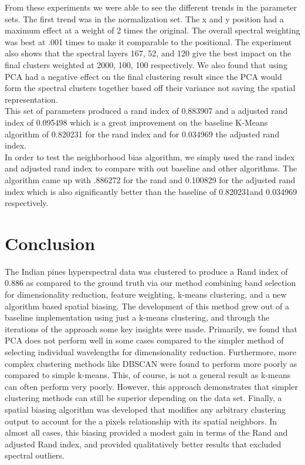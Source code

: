 \documentclass[journal]{IEEEtran}
\begin{document}
  From these experiments we were able to see the different trends in the parameter sets. The first trend was in the normalization set. The x and y position had a maximum effect at a weight of 2 times the original. The overall spectral weighting was best at .001 times to make it comparable to the positional. The experiment also shows that the spectral layers 167, 52, and 120 give the best impact on the final clusters weighted at 2000, 100, 100 respectively. We also found that using PCA had a negative effect on the final clustering result since the PCA would form the spectral clusters together based off their variance not saving the spatial representation.\\

  This set of parameters produced a rand index of 0.883907 and a adjusted rand index of 0.095498 which is a great improvement on the baseline K-Means algorithm of 0.820231 for the rand index and for 0.034969 the adjusted rand index.\\

  In order to test the neighborhood bias algorithm, we simply used the rand index and adjusted rand index to compare with out baseline and other algorithms. The algorithm came up with .886272 for the rand and 0.100829 for the adjusted rand index which is also significantly better than the baseline of 0.820231and 0.034969 respectively.\\

\section{Conclusion}
  The Indian pines hyperspectral data was clustered to produce a Rand index of 0.886 as compared to the ground truth via our method combining band selection for dimensionality reduction, feature weighting, k-means clustering, and a new algorithm based spatial biasing. The development of this method grew out of a baseline implementation using just a k-means clustering, and through the iterations of the approach some key insights were made. Primarily, we found that PCA does not perform well in some cases compared to the simpler method of selecting individual wavelengths for dimensionality reduction. Furthermore, more complex clustering methods like DBSCAN were found to perform more poorly as compared to simple k-means. This, of course, is not a general result as k-means can often perform very poorly. However, this approach demonstrates that simpler clustering methods can still be superior depending on the data set. Finally, a spatial biasing algorithm was developed that modifies any arbitrary clustering output to account for the a pixels relationship with its spatial neighbors. In almost all cases, this biasing provided a modest gain in terms of the Rand and adjusted Rand index, and provided qualitatively better results that excluded spectral outliers.\\
\end{document}
